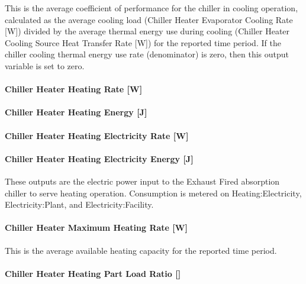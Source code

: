 This is the average coefficient of performance for the chiller in cooling operation, calculated as the average cooling load (Chiller Heater Evaporator Cooling Rate {[}W{]}) divided by the average thermal energy use during cooling (Chiller Heater Cooling Source Heat Transfer Rate {[}W{]}) for the reported time period. If the chiller cooling thermal energy use rate (denominator) is zero, then this output variable is set to zero.

\paragraph{Chiller Heater Heating Rate {[}W{]}}\label{chiller-heater-heating-rate-w-2}

\paragraph{Chiller Heater Heating Energy {[}J{]}}\label{chiller-heater-heating-energy-j-1}

\paragraph{Chiller Heater Heating Electricity Rate {[}W{]}}\label{chiller-heater-heating-electric-power-w-1}

\paragraph{Chiller Heater Heating Electricity Energy {[}J{]}}\label{chiller-heater-heating-electric-energy-j}

These outputs are the electric power input to the Exhaust Fired absorption chiller to serve heating operation. Consumption is metered on Heating:Electricity, Electricity:Plant, and Electricity:Facility.

\paragraph{Chiller Heater Maximum Heating Rate {[}W{]}}\label{chiller-heater-maximum-heating-rate-w}

This is the average available heating capacity for the reported time period.

\paragraph{Chiller Heater Heating Part Load Ratio {[]}}\label{chiller-heater-heating-part-load-ratio-1}

